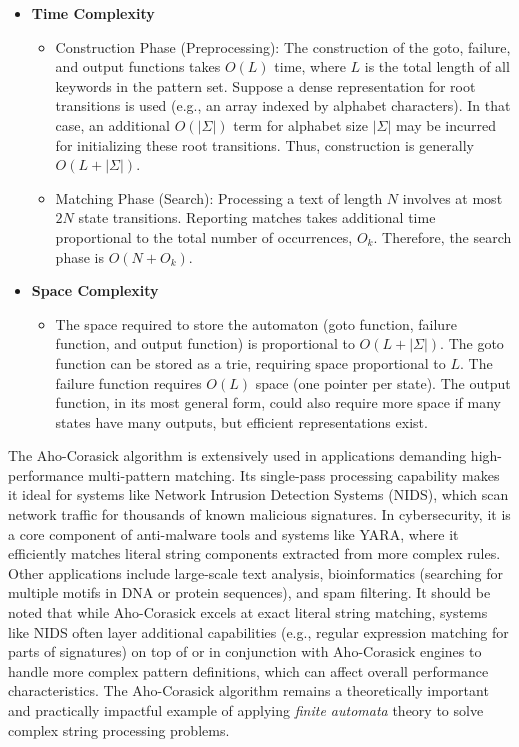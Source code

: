\begin{itemize}
    \item \textbf{Time Complexity}
    \begin{itemize}
        \item Construction Phase (Preprocessing): The construction of the goto, failure, and output functions takes $O(L)$ time, where $L$ is the total length of all keywords in the pattern set. Suppose a dense representation for root transitions is used (e.g., an array indexed by alphabet characters). In that case, an additional $O(|\Sigma|)$ term for alphabet size $|\Sigma|$ may be incurred for initializing these root transitions. Thus, construction is generally $O(L + |\Sigma|)$.
        \item Matching Phase (Search): Processing a text of length $N$ involves at most $2N$ state transitions. Reporting matches takes additional time proportional to the total number of occurrences, $O_k$. Therefore, the search phase is $O(N + O_k)$.
    \end{itemize}
    \item \textbf{Space Complexity}
    \begin{itemize}
        \item The space required to store the automaton (goto function, failure function, and output function) is proportional to $O(L + |\Sigma|)$. The goto function can be stored as a trie, requiring space proportional to $L$. The failure function requires $O(L)$ space (one pointer per state). The output function, in its most general form, could also require more space if many states have many outputs, but efficient representations exist.
    \end{itemize}
\end{itemize}


The Aho-Corasick algorithm is extensively used in applications demanding high-performance multi-pattern matching. Its single-pass processing capability makes it ideal for systems like Network Intrusion Detection Systems (NIDS), which scan network traffic for thousands of known malicious signatures. In cybersecurity, it is a core component of anti-malware tools and systems like YARA, where it efficiently matches literal string components extracted from more complex rules. Other applications include large-scale text analysis, bioinformatics (searching for multiple motifs in DNA or protein sequences), and spam filtering. It should be noted that while Aho-Corasick excels at exact literal string matching, systems like NIDS often layer additional capabilities (e.g., regular expression matching for parts of signatures) on top of or in conjunction with Aho-Corasick engines to handle more complex pattern definitions, which can affect overall performance characteristics. The Aho-Corasick algorithm remains a theoretically important and practically impactful example of applying \textit{finite automata} theory to solve complex string processing problems.

